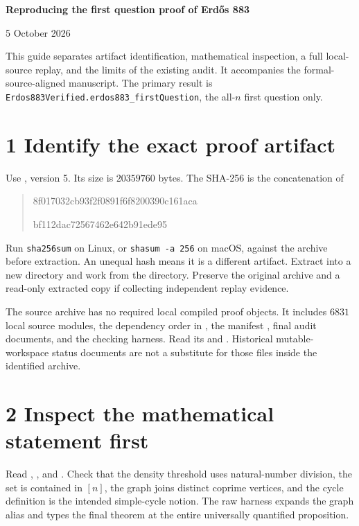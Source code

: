 \documentclass[10pt,letterpaper]{article}
\begin{document}
\begin{center}{\LARGE\bfseries Reproducing the first question proof of Erdős 883\par}\vspace{8pt}5 October 2026\end{center}
This guide separates artifact identification, mathematical inspection, a full local-source replay, and the limits of the existing audit. It accompanies the formal-source-aligned manuscript. The primary result is
\texttt{Erdos883Verified.erdos883\_firstQuestion}, the all-$n$ first question only.

\section*{1 Identify the exact proof artifact}
Use , version 5. Its size is $20359760$ bytes. The SHA-256 is the concatenation of
\begin{quote}\small\ttfamily
8f017032cb93f2f0891f6f8200390c161aca\par
bf112dac72567462e642b91ede95
\end{quote}
Run \texttt{sha256sum} on Linux, or \texttt{shasum -a 256} on macOS, against the archive before extraction. An unequal hash means it is a different artifact. Extract into a new directory and work from the  directory. Preserve the original archive and a read-only extracted copy if collecting independent replay evidence.

The source archive has no required local compiled proof objects. It includes $6831$ local source modules, the dependency order in , the manifest , final audit documents, and the checking harness. Read its  and . Historical mutable-workspace status documents are not a substitute for those files inside the identified archive.

\section*{2 Inspect the mathematical statement first}
Read , , and . Check that the density threshold uses natural-number division, the set is contained in $[n]$, the graph joins distinct coprime vertices, and the cycle definition is the intended simple-cycle notion. The raw harness expands the graph alias and types the final theorem at the entire universally quantified proposition.
\end{document}
